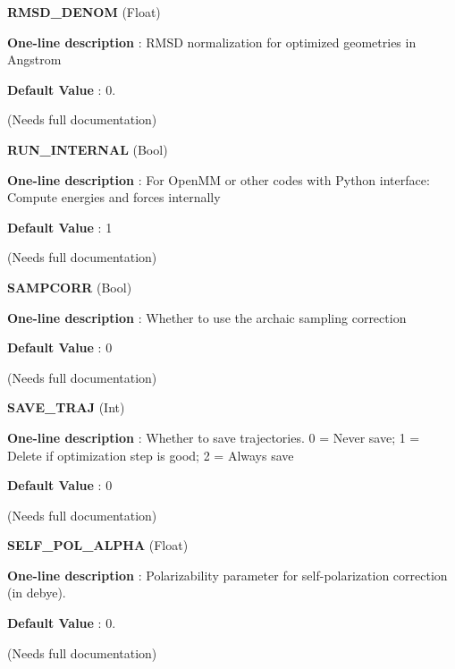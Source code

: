 \begin{DoxyItemize}
\item {\bfseries  \-R\-M\-S\-D\-\_\-\-D\-E\-N\-O\-M } (\-Float) \par
{\bfseries  \-One-\/line description }\-: \-R\-M\-S\-D normalization for optimized geometries in \-Angstrom \par
{\bfseries  \-Default \-Value }\-: 0. \par
(\-Needs full documentation)\end{DoxyItemize}
\begin{DoxyItemize}
\item {\bfseries  \-R\-U\-N\-\_\-\-I\-N\-T\-E\-R\-N\-A\-L } (\-Bool) \par
{\bfseries  \-One-\/line description }\-: \-For \-Open\-M\-M or other codes with \-Python interface\-: \-Compute energies and forces internally \par
{\bfseries  \-Default \-Value }\-: 1 \par
(\-Needs full documentation)\end{DoxyItemize}
\begin{DoxyItemize}
\item {\bfseries  \-S\-A\-M\-P\-C\-O\-R\-R } (\-Bool) \par
{\bfseries  \-One-\/line description }\-: \-Whether to use the archaic sampling correction \par
{\bfseries  \-Default \-Value }\-: 0 \par
(\-Needs full documentation)\end{DoxyItemize}
\begin{DoxyItemize}
\item {\bfseries  \-S\-A\-V\-E\-\_\-\-T\-R\-A\-J } (\-Int) \par
{\bfseries  \-One-\/line description }\-: \-Whether to save trajectories. 0 = \-Never save; 1 = \-Delete if optimization step is good; 2 = \-Always save \par
{\bfseries  \-Default \-Value }\-: 0 \par
(\-Needs full documentation)\end{DoxyItemize}
\begin{DoxyItemize}
\item {\bfseries  \-S\-E\-L\-F\-\_\-\-P\-O\-L\-\_\-\-A\-L\-P\-H\-A } (\-Float) \par
{\bfseries  \-One-\/line description }\-: \-Polarizability parameter for self-\/polarization correction (in debye). \par
{\bfseries  \-Default \-Value }\-: 0. \par
(\-Needs full documentation)\end{DoxyItemize}
